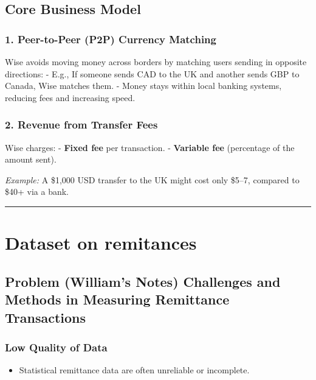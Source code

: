 \documentclass[
  11pt,
]{article}
\providecommand{\tightlist}{%
  \setlength{\itemsep}{0pt}\setlength{\parskip}{0pt}}
\begin{document}
\subsection{Core Business Model}\label{core-business-model}

\subsubsection{1. Peer-to-Peer (P2P) Currency
Matching}\label{peer-to-peer-p2p-currency-matching}

Wise avoids moving money across borders by matching users sending in
opposite directions: - E.g., If someone sends CAD to the UK and another
sends GBP to Canada, Wise matches them. - Money stays within local
banking systems, reducing fees and increasing speed.

\subsubsection{2. Revenue from Transfer
Fees}\label{revenue-from-transfer-fees}

Wise charges: - \textbf{Fixed fee} per transaction. - \textbf{Variable
fee} (percentage of the amount sent).

\emph{Example:} A \$1,000 USD transfer to the UK might cost only \$5--7,
compared to \$40+ via a bank.

\begin{center}\rule{0.5\linewidth}{0.5pt}\end{center}

\section{Dataset on remitances}\label{dataset-on-remitances}

\subsection{Problem (William's Notes) Challenges and Methods in
Measuring Remittance
Transactions}\label{problem-williams-notes-challenges-and-methods-in-measuring-remittance-transactions}

\subsubsection{Low Quality of Data}\label{low-quality-of-data}

\begin{itemize}
\tightlist
\item
  Statistical remittance data are often unreliable or incomplete.
\end{itemize}
\end{document}
